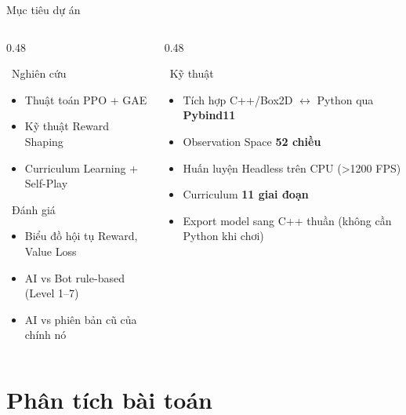 \documentclass[aspectratio=169, 11pt]{beamer}
\begin{document}
\begin{frame}{Mục tiêu dự án}
  \begin{columns}[T]
    \begin{column}{0.48\textwidth}
      \begin{block}{\faFlask~Nghiên cứu}
        \begin{itemize}
          \item Thuật toán PPO + GAE
          \item Kỹ thuật Reward Shaping
          \item Curriculum Learning + Self-Play
        \end{itemize}
      \end{block}
      \vspace{6pt}
      \begin{block}{\faChartBar~Đánh giá}
        \begin{itemize}
          \item Biểu đồ hội tụ Reward, Value Loss
          \item AI vs Bot rule-based (Level 1--7)
          \item AI vs phiên bản cũ của chính nó
        \end{itemize}
      \end{block}
    \end{column}
    \begin{column}{0.48\textwidth}
      \begin{block}{\faCogs~Kỹ thuật}
        \begin{itemize}
          \item Tích hợp C++/Box2D $\leftrightarrow$ Python qua \textbf{Pybind11}
          \item Observation Space \textbf{52 chiều}
          \item Huấn luyện Headless trên CPU (\textgreater 1200 FPS)
          \item Curriculum \textbf{11 giai đoạn}
          \item Export model sang C++ thuần (không cần Python khi chơi)
        \end{itemize}
      \end{block}
    \end{column}
  \end{columns}
\end{frame}

\section{Phân tích bài toán}
\end{document}
